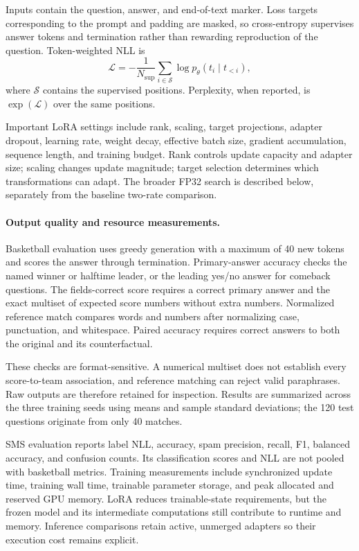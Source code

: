 Inputs contain the question, answer, and end-of-text marker. Loss targets corresponding to the prompt and padding are masked, so cross-entropy supervises answer tokens and termination rather than rewarding reproduction of the question. Token-weighted NLL is
\begin{equation}
 \mathcal{L}=-\frac{1}{N_{\mathrm{sup}}}
 \sum_{i\in\mathcal{S}}\log p_\theta(t_i\mid t_{<i}),
\end{equation}
where $\mathcal{S}$ contains the supervised positions. Perplexity, when reported, is $\exp(\mathcal{L})$ over the same positions.

Important LoRA settings include rank, scaling, target projections, adapter dropout, learning rate, weight decay, effective batch size, gradient accumulation, sequence length, and training budget. Rank controls update capacity and adapter size; scaling changes update magnitude; target selection determines which transformations can adapt. The broader FP32 search is described below, separately from the baseline two-rate comparison.

\paragraph{Output quality and resource measurements.}
Basketball evaluation uses greedy generation with a maximum of 40 new tokens and scores the answer through termination. Primary-answer accuracy checks the named winner or halftime leader, or the leading yes/no answer for comeback questions. The fields-correct score requires a correct primary answer and the exact multiset of expected score numbers without extra numbers. Normalized reference match compares words and numbers after normalizing case, punctuation, and whitespace. Paired accuracy requires correct answers to both the original and its counterfactual.

These checks are format-sensitive. A numerical multiset does not establish every score-to-team association, and reference matching can reject valid paraphrases. Raw outputs are therefore retained for inspection. Results are summarized across the three training seeds using means and sample standard deviations; the 120 test questions originate from only 40 matches.

SMS evaluation reports label NLL, accuracy, spam precision, recall, F1, balanced accuracy, and confusion counts. Its classification scores and NLL are not pooled with basketball metrics. Training measurements include synchronized update time, training wall time, trainable parameter storage, and peak allocated and reserved GPU memory. LoRA reduces trainable-state requirements, but the frozen model and its intermediate computations still contribute to runtime and memory. Inference comparisons retain active, unmerged adapters so their execution cost remains explicit.

